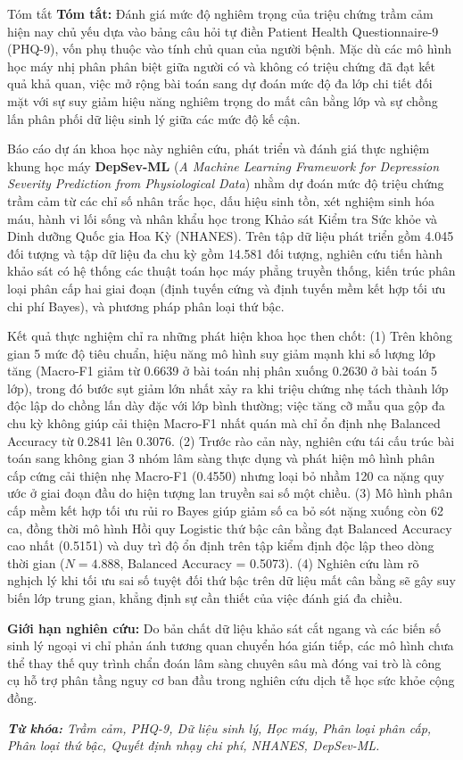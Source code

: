 \documentclass{uetgraduation}
\begin{document}
\begin{preamble}{Tóm tắt}
\textbf{Tóm tắt:} Đánh giá mức độ nghiêm trọng của triệu chứng trầm cảm hiện nay chủ yếu dựa vào bảng câu hỏi tự điền Patient Health Questionnaire-9 (PHQ-9), vốn phụ thuộc vào tính chủ quan của người bệnh. Mặc dù các mô hình học máy nhị phân phân biệt giữa người có và không có triệu chứng đã đạt kết quả khả quan, việc mở rộng bài toán sang dự đoán mức độ đa lớp chi tiết đối mặt với sự suy giảm hiệu năng nghiêm trọng do mất cân bằng lớp và sự chồng lấn phân phối dữ liệu sinh lý giữa các mức độ kế cận.

Báo cáo dự án khoa học này nghiên cứu, phát triển và đánh giá thực nghiệm khung học máy \textbf{DepSev-ML} (\textit{A Machine Learning Framework for Depression Severity Prediction from Physiological Data}) nhằm dự đoán mức độ triệu chứng trầm cảm từ các chỉ số nhân trắc học, dấu hiệu sinh tồn, xét nghiệm sinh hóa máu, hành vi lối sống và nhân khẩu học trong Khảo sát Kiểm tra Sức khỏe và Dinh dưỡng Quốc gia Hoa Kỳ (NHANES). Trên tập dữ liệu phát triển gồm 4.045 đối tượng và tập dữ liệu đa chu kỳ gồm 14.581 đối tượng, nghiên cứu tiến hành khảo sát có hệ thống các thuật toán học máy phẳng truyền thống, kiến trúc phân loại phân cấp hai giai đoạn (định tuyến cứng và định tuyến mềm kết hợp tối ưu chi phí Bayes), và phương pháp phân loại thứ bậc.

Kết quả thực nghiệm chỉ ra những phát hiện khoa học then chốt: (1) Trên không gian 5 mức độ tiêu chuẩn, hiệu năng mô hình suy giảm mạnh khi số lượng lớp tăng (Macro-F1 giảm từ 0.6639 ở bài toán nhị phân xuống 0.2630 ở bài toán 5 lớp), trong đó bước sụt giảm lớn nhất xảy ra khi triệu chứng nhẹ tách thành lớp độc lập do chồng lấn dày đặc với lớp bình thường; việc tăng cỡ mẫu qua gộp đa chu kỳ không giúp cải thiện Macro-F1 nhất quán mà chỉ ổn định nhẹ Balanced Accuracy từ 0.2841 lên 0.3076. (2) Trước rào cản này, nghiên cứu tái cấu trúc bài toán sang không gian 3 nhóm lâm sàng thực dụng và phát hiện mô hình phân cấp cứng cải thiện nhẹ Macro-F1 (0.4550) nhưng loại bỏ nhầm 120 ca nặng quy ước ở giai đoạn đầu do hiện tượng lan truyền sai số một chiều. (3) Mô hình phân cấp mềm kết hợp tối ưu rủi ro Bayes giúp giảm số ca bỏ sót nặng xuống còn 62 ca, đồng thời mô hình Hồi quy Logistic thứ bậc cân bằng đạt Balanced Accuracy cao nhất (0.5151) và duy trì độ ổn định trên tập kiểm định độc lập theo dòng thời gian ($N = 4.888$, Balanced Accuracy = 0.5073). (4) Nghiên cứu làm rõ nghịch lý khi tối ưu sai số tuyệt đối thứ bậc trên dữ liệu mất cân bằng sẽ gây suy biến lớp trung gian, khẳng định sự cần thiết của việc đánh giá đa chiều.

\textbf{Giới hạn nghiên cứu:} Do bản chất dữ liệu khảo sát cắt ngang và các biến số sinh lý ngoại vi chỉ phản ánh tương quan chuyển hóa gián tiếp, các mô hình chưa thể thay thế quy trình chẩn đoán lâm sàng chuyên sâu mà đóng vai trò là công cụ hỗ trợ phân tầng nguy cơ ban đầu trong nghiên cứu dịch tễ học sức khỏe cộng đồng.

\vspace{0.6cm}
\noindent \textit{\textbf{Từ khóa:} Trầm cảm, PHQ-9, Dữ liệu sinh lý, Học máy, Phân loại phân cấp, Phân loại thứ bậc, Quyết định nhạy chi phí, NHANES, DepSev-ML.}
\end{preamble}
\end{document}

